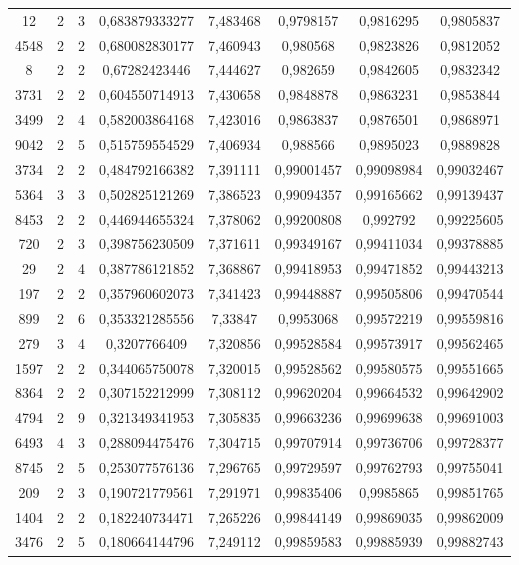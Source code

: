 \begin{longtable}{|c|c|c|c|c|c|c|c|}
12 & 2 & 3 & 0,683879333277 & 7,483468 & 0,9798157 & 0,9816295 & 0,9805837 \\
4548 & 2 & 2 & 0,680082830177 & 7,460943 & 0,980568 & 0,9823826 & 0,9812052 \\
8 & 2 & 2 & 0,67282423446 & 7,444627 & 0,982659 & 0,9842605 & 0,9832342 \\
3731 & 2 & 2 & 0,604550714913 & 7,430658 & 0,9848878 & 0,9863231 & 0,9853844 \\
3499 & 2 & 4 & 0,582003864168 & 7,423016 & 0,9863837 & 0,9876501 & 0,9868971 \\
9042 & 2 & 5 & 0,515759554529 & 7,406934 & 0,988566 & 0,9895023 & 0,9889828 \\
3734 & 2 & 2 & 0,484792166382 & 7,391111 & 0,99001457 & 0,99098984 & 0,99032467 \\
5364 & 3 & 3 & 0,502825121269 & 7,386523 & 0,99094357 & 0,99165662 & 0,99139437 \\
8453 & 2 & 2 & 0,446944655324 & 7,378062 & 0,99200808 & 0,992792 & 0,99225605 \\
720 & 2 & 3 & 0,398756230509 & 7,371611 & 0,99349167 & 0,99411034 & 0,99378885 \\
29 & 2 & 4 & 0,387786121852 & 7,368867 & 0,99418953 & 0,99471852 & 0,99443213 \\
197 & 2 & 2 & 0,357960602073 & 7,341423 & 0,99448887 & 0,99505806 & 0,99470544 \\
899 & 2 & 6 & 0,353321285556 & 7,33847 & 0,9953068 & 0,99572219 & 0,99559816 \\
279 & 3 & 4 & 0,3207766409 & 7,320856 & 0,99528584 & 0,99573917 & 0,99562465 \\
1597 & 2 & 2 & 0,344065750078 & 7,320015 & 0,99528562 & 0,99580575 & 0,99551665 \\
8364 & 2 & 2 & 0,307152212999 & 7,308112 & 0,99620204 & 0,99664532 & 0,99642902 \\
4794 & 2 & 9 & 0,321349341953 & 7,305835 & 0,99663236 & 0,99699638 & 0,99691003 \\
6493 & 4 & 3 & 0,288094475476 & 7,304715 & 0,99707914 & 0,99736706 & 0,99728377 \\
8745 & 2 & 5 & 0,253077576136 & 7,296765 & 0,99729597 & 0,99762793 & 0,99755041 \\
209 & 2 & 3 & 0,190721779561 & 7,291971 & 0,99835406 & 0,9985865 & 0,99851765 \\
1404 & 2 & 2 & 0,182240734471 & 7,265226 & 0,99844149 & 0,99869035 & 0,99862009 \\
3476 & 2 & 5 & 0,180664144796 & 7,249112 & 0,99859583 & 0,99885939 & 0,99882743 \\

\end{longtable}
